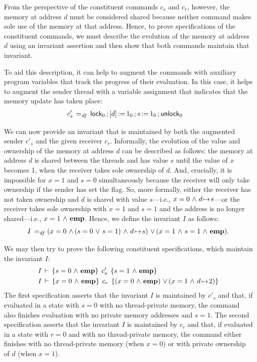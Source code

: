 \documentclass[11pt]{report}
\begin{document}
From the perspective of the constituent commands $c_s$ and $c_r$, however, the memory at address $d$ must be considered shared because neither command makes sole use of the memory at that address. Hence, to prove specifications of the constituent commands, we must describe the evolution of the memory at address $d$ using an invariant assertion and then show that both commands maintain that invariant. 

To aid this description, it can help to augment the commands with auxiliary program variables that track the progress of their evaluation. In this case, it helps to augment the sender thread with a variable assignment that indicates that the memory update has taken place: 
\begin{align*}
c'_s \operatorname{\;=_{\mathit{df}}\;} & \operatorname{\mathsf{lock}}_0 \operatorname{;} \left[ d \right] \operatorname{:\!=} 1_0 \operatorname{;} s \operatorname{:\!=} 1_0 \operatorname{;} \operatorname{\mathsf{unlock}}_0
\end{align*}

We can now provide an invariant that is maintained by both the augmented sender $c'_s$ and the given receiver $c_r$. Informally, the evolution of the value and ownership of the memory at address $d$ can be described as follows: the memory at address $d$ is shared between the threads and has value $s$ until the value of $x$ becomes 1, when the receiver takes sole ownership of $d$. And, crucially, it is impossible for $x = 1$ and $s = 0$ simultaneously because the receiver will only take ownership if the sender has set the flag. So, more formally, either the receiver has not taken ownership and $d$ is shared with value $s$---i.e., $x = 0 \operatorname{\,\wedge\,} d \!\mapsto\! s$---or the receiver takes sole ownership with $x = 1$ and $s = 1$ and the address is no longer shared---i.e., $x = 1 \operatorname{\,\wedge\,} \mathbf{emp}$. Hence, we define the invariant $I$ as follows: \[ I \operatorname{\;=_{\mathit{df}}\;} (x = 0 \operatorname{\,\wedge\,} (s = 0 \operatorname{\,\vee\,} s = 1) \operatorname{\,\wedge\,} d \!\mapsto\! s) \operatorname{\,\vee\,} (x = 1 \operatorname{\,\wedge\,} s = 1 \operatorname{\,\wedge\,} \mathbf{emp}).\]

We may then try to prove the following constituent specifications, which maintain the invariant $I$: \begin{align*}
  &I\,\vdash\,\left\lbrace s = 0 \operatorname{\,\wedge\,} \mathbf{emp} \right\rbrace\;c'_s\;\left\lbrace s = 1 \operatorname{\,\wedge\,} \mathbf{emp} \right\rbrace \\
  &I\,\vdash\,\left\lbrace x = 0 \operatorname{\,\wedge\,} \mathbf{emp} \right\rbrace\;c_r\;\left\lbrace (x = 0 \operatorname{\,\wedge\,} \mathbf{emp}) \operatorname{\,\vee\,} (x = 1 \operatorname{\,\wedge\,} d \!\mapsto\! 2) \right\rbrace
\end{align*} The first specification asserts that the invariant $I$ is maintained by $c'_s$ and that, if evaluated in a state with $s = 0$ with no thread-private memory, the command also finishes evaluation with no private memory addresses and $s = 1$. The second specification asserts that the invariant $I$ is maintained by $c_r$ and that, if evaluated in a state with $r = 0$ and with no thread-private memory, the command either finishes with no thread-private memory (when $x = 0$) or with private ownership of $d$ (when $x = 1$). 
\end{document}
